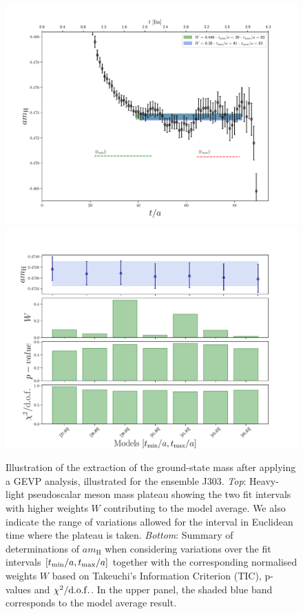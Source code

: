 \begin{figure}
  	\centering
  	\includegraphics[scale=0.5]{./cap6/figs/matching/m8_plateau.pdf}
  	\includegraphics[scale=0.5]{./cap6/figs/matching/mps_BMA_8.pdf}
  	\caption{Illustration of the extraction of the ground-state mass after applying a GEVP analysis, illustrated for the ensemble J303. \textit{Top}: Heavy-light pseudoscalar meson mass plateau showing the  two fit intervals with higher weights $W$ contributing to the model average. We also indicate the range of variations allowed for the interval in Euclidean time where the plateau is taken. \textit{Bottom}: Summary of determinations of $am_{\mathrm H}$ when considering variations over the fit intervals $[t_{\rm min}/a, t_{\rm max}/a]$ together with  the corresponding normalised weights $W$ based on Takeuchi's Information Criterion (TIC), p-values and $\chi^2/{\rm d.o.f.}$. In the upper panel, the shaded blue band  corresponds to the model average result.} 
\label{fig:meff_plateau} 
\end{figure}
  


